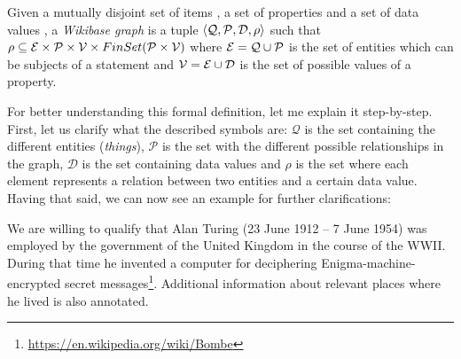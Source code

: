 \begin{definition}
    Given a mutually disjoint set of items \ItemSet{}, a set of properties \PropSet{} and a set of data values \DataValueSet{}, a \emph{Wikibase graph} is a tuple $\langle\mathcal{Q},\mathcal{P},\mathcal{D},\rho\rangle$ such that $\rho\subseteq\mathcal{E}\times\mathcal{P}\times\mathcal{V}\times FinSet(\mathcal{P}\times\mathcal{V})$ where $\mathcal{E}=\mathcal{Q}\cup\mathcal{P}$ is the set of entities which can be subjects of a statement and $\mathcal{V}=\mathcal{E}\cup\mathcal{D}$ is the set of possible values of a property.
\end{definition}

For better understanding this formal definition, let me explain it step-by-step. First, let us clarify what the described symbols are: $\mathcal{Q}$ is the set containing the different entities (\textit{things}), $\mathcal{P}$ is the set with the different possible relationships in the graph, $\mathcal{D}$ is the set containing data values and $\rho$ is the set where each element represents a relation between two entities and a certain data value. Having that said, we can now see an example for further clarifications:

\begin{example}
    We are willing to qualify that Alan Turing (23 June 1912 -- 7 June 1954) was employed by the government of the United Kingdom in the course of the WWII. During that time he invented a computer for deciphering Enigma-machine-encrypted secret messages\footnote{\url{https://en.wikipedia.org/wiki/Bombe}}. Additional information about relevant places where he lived is also annotated.
\end{example}

